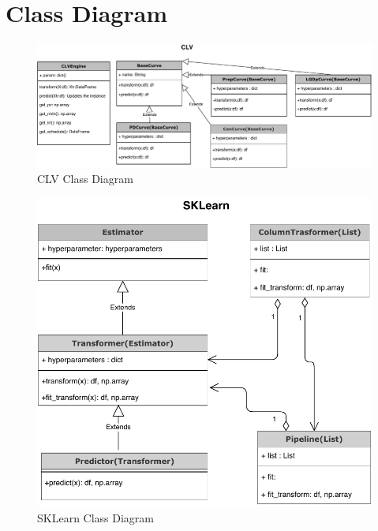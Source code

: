 \section{Class Diagram}
\begin{figure}[H]
  \centering
      \includegraphics[width=1\textwidth]{diagrCLV.pdf} 
 \caption{CLV Class Diagram}
 \label{fig:Test}
\end{figure}

\begin{figure}[H]
  \centering
      \includegraphics[width=.6\textwidth]{diagrSklearn.pdf} 
 \caption{SKLearn Class Diagram}
 \label{fig:Test}
\end{figure}

